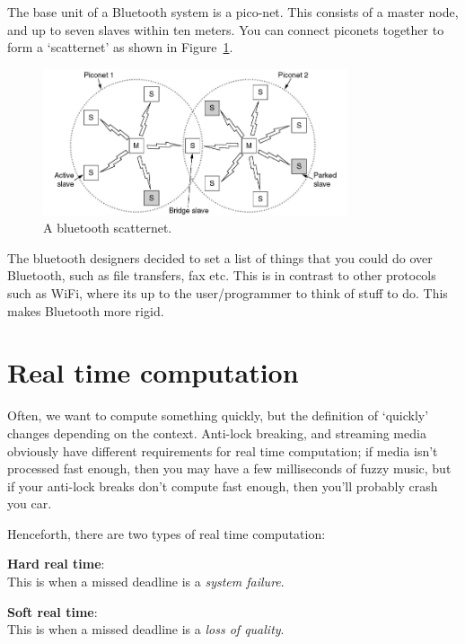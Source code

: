 The base unit of a Bluetooth system is a pico-net. This consists of a master
node, and up to seven slaves within ten meters. You can connect piconets
together to form a `scatternet' as shown in Figure~\ref{scatternet}.

\begin{figure}
  \centering
  \includegraphics[width=0.8\textwidth]{images/scatternet}
  \caption{A bluetooth scatternet.}
  \label{scatternet}
\end{figure}

The bluetooth designers decided to set a list of things that you could do over
Bluetooth, such as file transfers, fax etc. This is in contrast to other
protocols such as WiFi, where its up to the user/programmer to think of stuff to
do. This makes Bluetooth more rigid.

\section{Real time computation}

Often, we want to compute something quickly, but the definition of `quickly'
changes depending on the context. Anti-lock breaking, and streaming media
obviously have different requirements for real time computation; if media isn't
processed fast enough, then you may have a few milliseconds of fuzzy music, but
if your anti-lock breaks don't compute fast enough, then you'll probably crash
you car.

Henceforth, there are two types of real time computation:

\begin{description}
  \item \textbf{Hard real time}:\\
    This is when a missed deadline is a \textit{system failure}.
  \item \textbf{Soft real time}:\\
    This is when a missed deadline is a \textit{loss of quality}.
\end{description}


